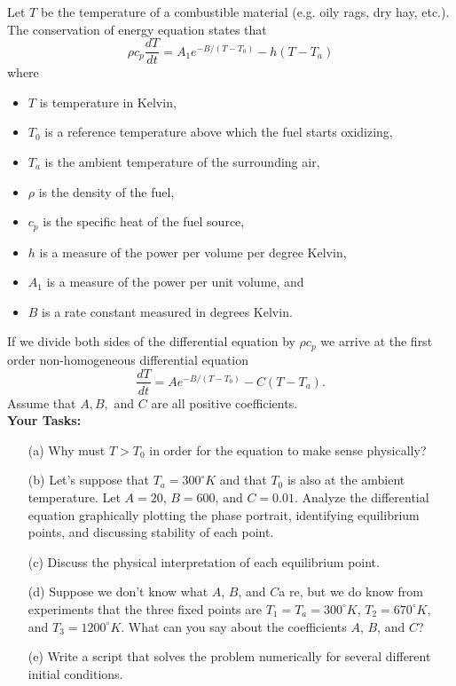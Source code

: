 \begin{problem}
    Let $T$ be the temperature of a combustible material (e.g. oily rags, dry hay, etc.).
    The conservation of energy equation states that 
    \[ \rho c_p \frac{dT}{dt} = A_1 e^{-B/(T-T_0)} - h\left( T - T_a \right) \]
    where 
    \begin{itemize}
        \item $T$ is temperature in Kelvin,
        \item $T_0$ is a reference temperature above which the fuel starts oxidizing,
        \item $T_a$ is the ambient temperature of the surrounding air,
        \item $\rho$ is the density of the fuel,
        \item $c_p$ is the specific heat of the fuel source, 
        \item $h$ is a measure of the power per volume per degree Kelvin,
        \item $A_1$ is a measure of the power per unit volume, and
        \item $B$ is a rate constant measured in degrees Kelvin.
    \end{itemize}
    If we divide both sides of the differential equation by $\rho c_p$ we arrive at the
    first order non-homogeneous differential equation
    \[ \frac{dT}{dt} = A e^{-B/(T-T_0)} - C \left( T - T_a \right). \]  
    Assume that $A, B,$ and $C$ are all positive coefficients.
    \\{\bf Your Tasks:}
    \begin{enumerate}
        \item[(a)] Why must $T > T_0$ in order for the equation to make sense physically?
        \item[(b)] Let's suppose that $T_a = 300^\circ K$ and that $T_0$ is also at the
            ambient temperature.  Let $A = 20$, $B = 600$, and $C = 0.01$.  Analyze the
            differential equation graphically plotting the phase portrait, identifying
            equilibrium points, and discussing stability of each point.
        \item[(c)] Discuss the physical interpretation of each equilibrium point.
        \item[(d)] Suppose we don't know what $A$, $B$, and $C$a re, but we do know from
            experiments that the three fixed points are $T_1 = T_a = 300^\circ K$, $T_2 =
            670^\circ K$, and $T_3 = 1200^\circ K$.  What can you say about the
            coefficients $A$, $B$, and $C$?
        \item[(e)] Write a script that solves the problem numerically for several
            different initial conditions.
    \end{enumerate}
\end{problem}
